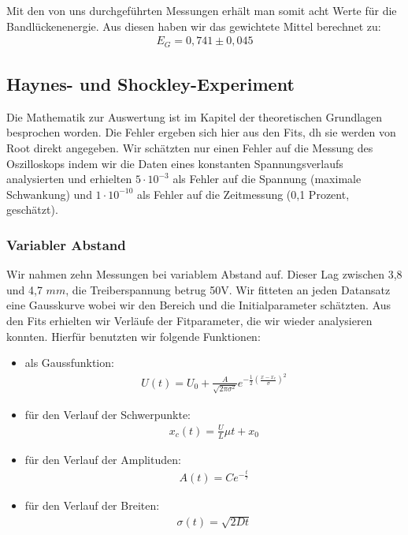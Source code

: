 \documentclass[12pt]{article}
\begin{document}
Mit den von uns durchgeführten Messungen erhält man somit acht Werte für die Bandlückenenergie. Aus diesen haben wir das gewichtete Mittel berechnet zu:
\begin{align*}
 E_G = 0,741 \pm 0,045
\end{align*}

\subsection{Haynes- und Shockley-Experiment}
\captionfont\footnotesize
Die Mathematik zur Auswertung ist im Kapitel der theoretischen Grundlagen besprochen worden. Die Fehler ergeben sich hier aus den Fits, dh sie werden von Root direkt angegeben. Wir schätzten nur einen Fehler auf die Messung des Oszilloskops indem wir die Daten eines konstanten Spannungsverlaufs analysierten und erhielten $5 \cdot 10^{-3}$ als Fehler auf die Spannung (maximale Schwankung) und $1 \cdot 10^{-10}$ als Fehler auf die Zeitmessung (0,1 Prozent, geschätzt).

\subsubsection{Variabler Abstand}
 Wir nahmen zehn Messungen bei variablem Abstand auf. Dieser Lag zwischen 3,8 und 4,7 $mm$, die Treiberspannung betrug 50V. Wir fitteten an jeden Datansatz eine Gausskurve wobei wir den Bereich und die Initialparameter schätzten. Aus den Fits erhielten wir Verläufe der Fitparameter, die wir wieder analysieren konnten. Hierfür benutzten wir folgende Funktionen:
\begin{itemize}
 \item als Gaussfunktion: 
\begin{align*}
U(t) = U_0 + \frac{A}{\sqrt{2\pi \sigma^2}}e^{-\frac{1}{2} \left( \frac{x -x_c}{\sigma}\right)^2 }
\end{align*}
 \item für den Verlauf der Schwerpunkte:
\begin{align*}
x_c(t) = \frac{U}{L} \mu t + x_0
\end{align*}
 \item für den Verlauf der Amplituden:
\begin{align*}
A(t) = C e^{-\frac{t}{\tau}}
\end{align*}
 \item für den Verlauf der Breiten:
\begin{align*}
\sigma(t) = \sqrt{2 D t}
\end{align*}
\end{itemize}
\end{document}
